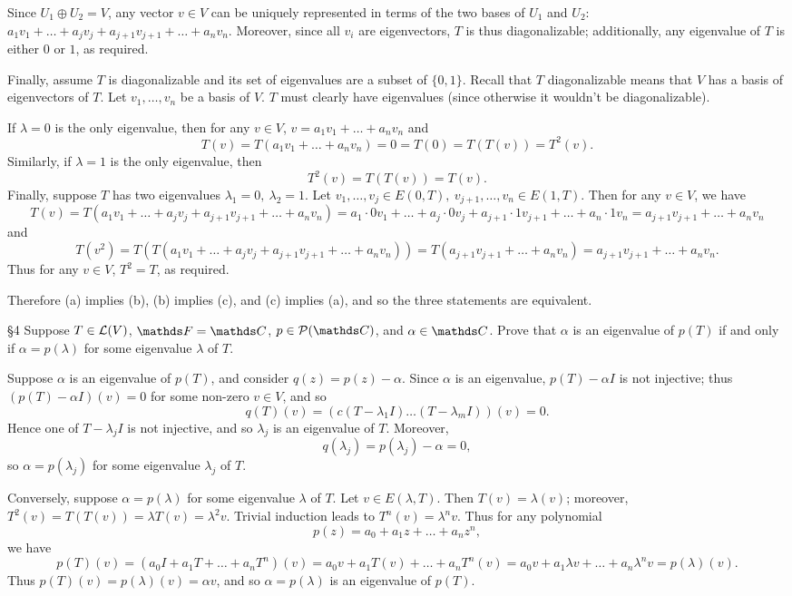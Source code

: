 \documentclass{homework}
\begin{document}
\begin{solution}
  Since $U_1\oplus U_2=V$, any vector $v\in V$ can be uniquely represented in terms of the two bases
  of $U_1$ and $U_2$: $a_1v_1+\ldots+a_jv_j+a_{j+1}v_{j+1}+\ldots+a_nv_n$. Moreover, since all $v_i$
  are eigenvectors, $T$ is thus diagonalizable; additionally, any eigenvalue of $T$ is either $0$ or
  $1$, as required.

  Finally, assume $T$ is diagonalizable and its set of eigenvalues are a subset of $\{ 0,1 \}$.
  Recall that $T$ diagonalizable means that $V$ has a basis of eigenvectors of $T$. Let
  $v_1,\ldots,v_n$ be a basis of $V$. $T$ must clearly have eigenvalues (since otherwise it wouldn't
  be diagonalizable).

  If $\lambda=0$ is the only eigenvalue, then for any $v\in V$, $v=a_1v_1+\ldots+a_nv_n$ and \[
    T(v)=T(a_1v_1+\ldots+a_nv_n)=0=T(0)=T(T(v))=T^2(v)
  .\] Similarly, if $\lambda=1$ is the only eigenvalue, then \[
  T^2(v)=T(T(v))=T(v)
  .\] Finally, suppose $T$ has two eigenvalues $\lambda_1=0,\ \lambda_2=1$. Let $v_1,\ldots,v_j\in
  E(0,T),\ v_{j+1},\ldots,v_n\in E(1,T)$. Then for any $v\in V$, we have \[
    T(v)=T(a_1v_1+\ldots+a_jv_j+a_{j+1}v_{j+1}+\ldots+a_nv_n)=a_1\cdot 0v_1+\ldots+a_j\cdot
    0v_j+a_{j+1}\cdot 1v_{j+1}+\ldots+a_n\cdot 1v_n=a_{j+1}v_{j+1}+\ldots+a_nv_n
  \] and \[
  T(v^2)=T(T(a_1v_1+\ldots+a_jv_j+a_{j+1}v_{j+1}+\ldots+a_nv_n))=T(a_{j+1}v_{j+1}+\ldots+a_nv_n)=a_{j+1}v_{j+1}+\ldots+a_nv_n
  .\] Thus for any $v\in V$, $T^2=T$, as required.
  
  Therefore (a) implies (b), (b) implies (c), and (c) implies (a), and so the three statements are
  equivalent.
\end{solution}

\begin{problem}{\S 4}
  Suppose $T\in \mathcal{L}(V)$, $\F=\C$, $p\in \mc{P}(\C)$, and $\alpha\in \C$. Prove that $\alpha$ is
  an eigenvalue of $p(T)$ if and only if $\alpha=p(\lambda)$ for some eigenvalue $\lambda$ of $T$.
\end{problem}
\begin{solution}
  Suppose $\alpha$ is an eigenvalue of $p(T)$, and consider $q(z)=p(z)-\alpha$. Since $\alpha$ is an
  eigenvalue, $p(T)-\alpha I$ is not injective; thus $(p(T)-\alpha I)(v)=0$ for some non-zero $v\in
  V$, and so \[
    q(T)(v)=\left( c(T-\lambda_1 I)\ldots(T-\lambda_m I) \right) (v)=0
  .\] Hence one of $T-\lambda_jI$ is not injective, and so $\lambda_j$ is an eigenvalue of $T$.
  Moreover, \[
    q(\lambda_j)=p(\lambda_j)-\alpha=0
  ,\] so $\alpha=p(\lambda_j)$ for some eigenvalue $\lambda_j$ of $T$.

  Conversely, suppose $\alpha=p(\lambda)$ for some eigenvalue $\lambda$ of $T$. Let $v\in
  E(\lambda,T)$. Then $T(v)=\lambda(v)$; moreover, $T^2(v)=T(T(v))=\lambda T(v)=\lambda^2v$. Trivial
  induction leads to $T^n(v)=\lambda^nv$. Thus for any polynomial \[
    p(z)=a_0+a_1z+\ldots+a_nz^n
  ,\] we have \[
  p(T)(v)=(a_0I+a_1T+\ldots+a_nT^n)(v)=a_0v+a_1T(v)+\ldots+a_nT^n(v)=a_0v+a_1\lambda
  v+\ldots+a_n\lambda^nv=p(\lambda)(v)
.\] Thus $p(T)(v)=p(\lambda)(v)=\alpha v$, and so $\alpha=p(\lambda)$ is an eigenvalue of $p(T)$.
\end{solution}
 
\end{document}
